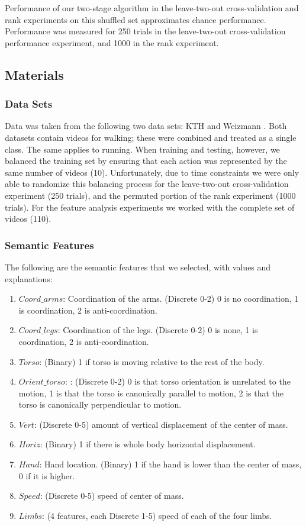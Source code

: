 \documentclass{article}
\begin{document}
Performance of our two-stage algorithm in the leave-two-out cross-validation and rank experiments on this shuffled set approximates chance performance. Performance was measured for 250 trials in the leave-two-out cross-validation performance experiment, and 1000 in the rank experiment.
\label{stats}

\subsection{Materials}
\subsubsection{Data Sets}
Data was taken from the following two data sets: KTH \cite{kth} and Weizmann \cite{weizmann}. Both datasets contain videos for walking; these were combined and treated as a single class. The same applies to running.  When training and testing, however, we balanced the training set by ensuring that each action was represented by the same number of videos (10). Unfortunately, due to time constraints we were only able to randomize this balancing process for the leave-two-out cross-validation experiment (250 trials), and the permuted portion of the rank experiment (1000 trials). For the feature analysis experiments we worked with the complete set of videos (110).

\subsubsection{Semantic Features}
\label{sf}
The following are the semantic features that we selected, with values and explanations:
\begin{enumerate}
\item
$Coord\_arms$: Coordination of the arms. (Discrete 0-2) 0 is no coordination, 1 is coordination, 2 is anti-coordination.
\item
$Coord\_legs$: Coordination of the legs. (Discrete 0-2) 0 is none, 1 is coordination, 2 is anti-coordination.
\item
$Torso$: (Binary) 1 if torso is moving relative to the rest of the body.
\item
$Orient\_torso$: : (Discrete 0-2) 0 is that torso orientation is unrelated to the motion, 1 is that the torso is canonically parallel to motion, 2 is that the torso is canonically perpendicular to motion.
\item
$Vert$: (Discrete 0-5) amount of vertical displacement of the center of mass.
\item
$Horiz$: (Binary) 1 if there is whole body horizontal displacement.
\item
$Hand$: Hand location. (Binary) 1 if the hand is lower than the center of mass, 0 if it is higher.
\item
$Speed$: (Discrete 0-5) speed of center of mass.
\item
$Limbs$: (4 features, each Discrete 1-5) speed of each of the four limbs.
\end{enumerate}
\end{document}
